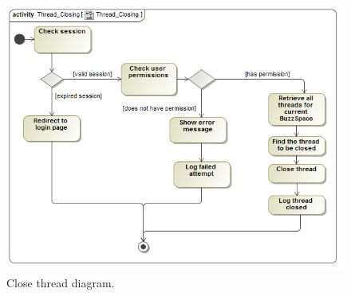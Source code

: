 \documentclass [a4paper,12pt] {article}
\begin{document}
			\begin{figure}[H]
				\centering
				\includegraphics[width=1.0\textwidth]{ThreadClosingAD.png}
				\caption{Close thread diagram.}
			\end{figure}
\end{document}
